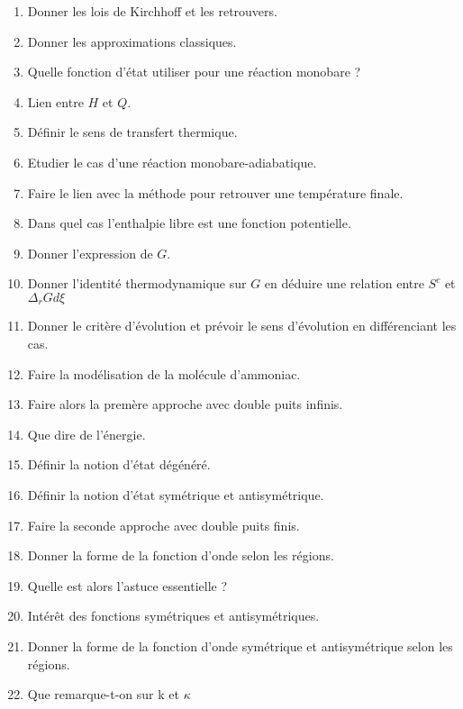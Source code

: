 \documentclass[a4paper, 11pt, hidelinks]{article}
\begin{document}
\begin{enumerate}
    \item Donner les lois de Kirchhoff et les retrouvers. \cite{Chapitre2bis}
    \item Donner les approximations classiques. \cite{Chapitre2bis}
    \item Quelle fonction d'état utiliser pour une réaction monobare ? \cite{Chapitre3bis}
    \item Lien entre $H$ et $Q$. \cite{Chapitre3bis}
    \item Définir le sens de transfert thermique. \cite{Chapitre3bis}
    \item Etudier le cas d'une réaction monobare-adiabatique. \cite{Chapitre3bis}
    \item Faire le lien avec la méthode pour retrouver une température finale. \cite{Chapitre3bis}
    \item Dans quel cas l'enthalpie libre est une fonction potentielle. \cite{Chapitre3bis}
    \item Donner l'expression de $G$. \cite{Chapitre3bis}
    \item Donner l'identité thermodynamique sur $G$ en déduire une relation entre $S^c$ et $\Delta_r G d \xi$ \cite{Chapitre3bis}
    \item Donner le critère d'évolution et prévoir le sens d'évolution en différenciant les cas. \cite{Chapitre3bis}
    \item Faire la modélisation de la molécule d'ammoniac. \cite{Chapitre23}
    \item Faire alors la premère approche avec double puits infinis. \cite{Chapitre23}
    \item Que dire de l'énergie. \cite{Chapitre23}
    \item Définir la notion d'état dégénéré. \cite{Chapitre23}
    \item Définir la notion d'état symétrique et antisymétrique. \cite{Chapitre23}
    \item Faire la seconde approche avec double puits finis. \cite{Chapitre23}
    \item Donner la forme de la fonction d'onde selon les régions. \cite{Chapitre23}
    \item Quelle est alors l'astuce essentielle ? \cite{Chapitre23}
    \item Intérêt des fonctions symétriques et antisymétriques. \cite{Chapitre23}
    \item Donner la forme de la fonction d'onde symétrique et antisymétrique selon les régions. \cite{Chapitre23}
    \item Que remarque-t-on sur k et $\kappa$ \cite{Chapitre23}

\end{enumerate}
\end{document}
